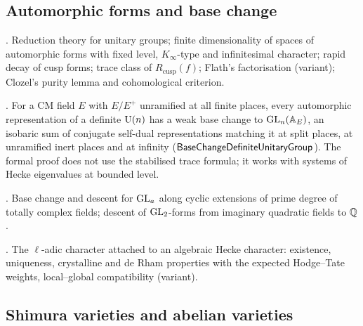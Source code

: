 \subsection{Automorphic forms and base change}\label{sec:literature:aut}

\begin{description}[leftmargin=0pt,itemsep=1pt,parsep=0pt,font=\normalfont\itshape]
\item[Automorphic forms]
  \cite{Borel1969,HarishChandra1968,MoeglinWaldspurger1995,Flath1979,Clozel1990}.  Reduction theory
  for unitary groups; finite dimensionality of spaces of automorphic forms with fixed level,
  $K_\infty$-type and infinitesimal character; rapid decay of cusp forms; trace class of
  $R_{\mathrm{cusp}}(f)$; Flath's factorisation (variant); Clozel's purity lemma and cohomological
  criterion.  
\item[Base change for unitary groups] \cite{Labesse2011}.  For a CM field $E$ with $E/E^+$
  unramified at all finite places, every automorphic representation of a definite $\operatorname{U}(n)$ has a
  weak base change to $\operatorname{GL}_n(\mathbb{A}_E)$, an isobaric sum of conjugate self-dual representations matching
  it at split places, at unramified inert places and at infinity
  ($\mathsf{BaseChangeDefiniteUnitaryGroup}$).  The formal proof does not use the stabilised trace
  formula; it works with systems of Hecke eigenvalues at bounded level.  
\item[Cyclic base change] \cite{ArthurClozel1989,Langlands1980}.  Base change and descent for
  $\operatorname{GL}_a$ along cyclic extensions of prime degree of totally complex fields; descent of $\operatorname{GL}_2$-forms
  from imaginary quadratic fields to $\mathbb{Q}$.  
\item[Hecke characters] \cite{Weil1956,Serre1968}.  The $\ell$-adic character attached to an
  algebraic Hecke character: existence, uniqueness, crystalline and de Rham properties with the
  expected Hodge--Tate weights, local--global compatibility (variant).
\end{description}

\subsection{Shimura varieties and abelian varieties}\label{sec:literature:shimura}

